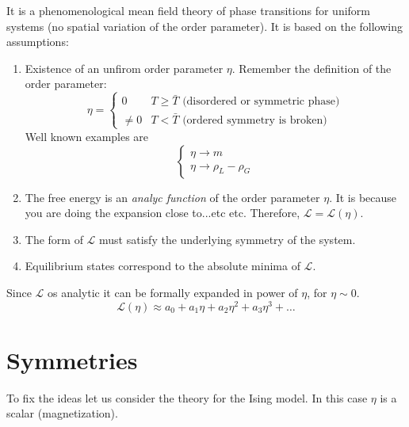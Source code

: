 \documentclass[../main/main.tex]{subfiles}
\begin{document}
It is a phenomenological mean field theory of phase transitions for uniform systems (no spatial variation of the order parameter). It is based on the following assumptions:
\begin{enumerate}
\item Existence of an unfirom order parameter \( \eta   \). Remember the definition of the order parameter:
\begin{equation}
  \eta   = \begin{cases}
    0 & T \ge \bar{T} \text{ (disordered or symmetric phase)}\\
    \neq 0 & T < \bar{T}  \text{ (ordered symmetry is broken)}
\end{cases}
\end{equation}
Well known examples are
\begin{equation}
  \begin{cases}
   \eta \rightarrow m \\
  \eta  \rightarrow \rho _L - \rho _G
  \end{cases}
\end{equation}
\item The free energy is an \emph{analyc function}  of the order parameter \( \eta   \). It is because you are doing the expansion close to...etc etc. Therefore, \( \mathcal{L} = \mathcal{L} (\eta ) \).
\item The form of \( \mathcal{L} \) must satisfy the underlying symmetry of the system.
\item Equilibrium states correspond to the absolute minima of \( \mathcal{L} \).
\end{enumerate}
\begin{remark}
Since \( \mathcal{L} \) os analytic it can be formally expanded in power of \( \eta  \), for \( \eta \sim 0 \).
\begin{equation}
  \mathcal{L} (\eta ) \approx a_0 + a_1 \eta + a_2 \eta ^2 + a_3 \eta ^3 + \dots
\end{equation}
\end{remark}

\section{Symmetries}
To fix the ideas let us consider the theory for the Ising model. In this case \( \eta  \) is a scalar (magnetization).
\end{document}
